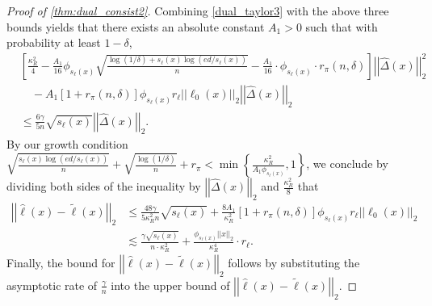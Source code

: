 \documentclass[10pt,a4paper]{amsart}
\theoremstyle{plain}
\theoremstyle{remark}
\renewcommand{\hat}{\widehat}
\renewcommand{\tilde}{\widetilde}
\newcommand{\norm}[1]{\left|\left| #1 \right|\right|}
\begin{document}
\begin{proof}[Proof of \autoref{thm:dual_consist2}]
	Combining \eqref{dual_taylor3} with the above three bounds yields that there exists an absolute constant $A_1>0$ such that with probability at least $1-\delta$,
	\begin{align*}
		&\left[\frac{\kappa_R^2}{4} - \frac{A_1}{16}\phi_{s_{\ell}(x)} \sqrt{\frac{\log(1/\delta)+s_{\ell}(x)\log(ed/s_{\ell}(x))}{n}} -\frac{A_1}{16} \cdot \phi_{s_{\ell}(x)} \cdot r_{\pi}(n,\delta) \right]\norm{\hat{\Delta}(x)}_2^2 \\
		&\quad - A_1 \left[1+r_{\pi}(n,\delta)\right] \phi_{s_{\ell}(x)} r_{\ell} \norm{\ell_0(x)}_2\norm{\hat{\Delta}(x)}_2\\
		&\leq \frac{6\gamma}{5n} \sqrt{s_{\ell}(x)} \norm{\hat{\Delta}(x)}_2.
	\end{align*}
	By our growth condition $\sqrt{\frac{s_{\ell}(x)\log(ed/s_{\ell}(x))}{n}} + \sqrt{\frac{\log(1/\delta)}{n}} + r_{\pi} < \min\left\{\frac{\kappa_R^2}{A_1 \phi_{s_{\ell}(x)}}, 1 \right\}$, we conclude by dividing both sides of the inequality by $\norm{\hat{\Delta}(x)}_2$ and $\frac{\kappa_R^2}{8}$ that
	\begin{align*}
		\norm{\hat{\ell}(x) - \tilde{\ell}(x)}_2 &\leq \frac{48\gamma}{5\kappa_R^2 n} \sqrt{s_{\ell}(x)} + \frac{8A_1}{\kappa_R^2} \left[1+r_{\pi}(n,\delta)\right] \phi_{s_{\ell}(x)} r_{\ell} \norm{\ell_0(x)}_2\\
		&\lesssim \frac{\gamma \sqrt{s_{\ell}(x)}}{n \cdot \kappa_R^2} + \frac{\phi_{s_{\ell}(x)} \norm{x}_2}{\kappa_R^4} \cdot r_{\ell}.
	\end{align*}
	Finally, the bound for $\norm{\hat{\ell}(x)-\tilde{\ell}(x)}_2$ follows by substituting the asymptotic rate of $\frac{\gamma}{n}$ into the upper bound of $\norm{\hat{\ell}(x)-\tilde{\ell}(x)}_2$.
\end{proof}
\end{document}
